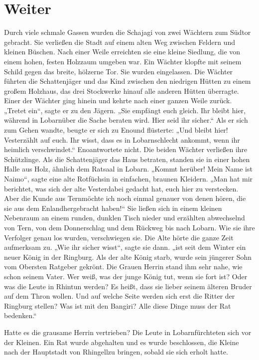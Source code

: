 \documentclass[12pt,a4paper,onecolumn,twoside,ngerman]{book}
\newcommand{\Tern}{Tern}
\newcommand{\Bangiri}{Bangiri}
\newcommand{\Enland}{Enland}
\newcommand{\Eno}{Eno}
\newcommand{\Lobarn}{Lobarn}
\newcommand{\Vester}{Vester}
\newcommand{\Naimo}{Naimo}
\newcommand{\Rhingell}{Rhingell}
\newcommand{\Rhin}{Rhin}
\begin{document}
\section{Weiter}
Durch viele schmale Gassen wurden die Schajagi von zwei Wächtern zum Südtor gebracht. Sie verließen die Stadt auf einem alten Weg zwischen Feldern und kleinen Büschen. Nach einer Weile erreichten sie eine kleine Siedlung, die von einem hohen, festen Holzzaum umgeben war. Ein Wächter klopfte mit seinem Schild gegen das breite, hölzerne Tor. Sie wurden eingelassen. Die Wächter führten die Schattenjäger und das Kind zwischen den niedrigen Hütten zu einem großem Holzhaus, das drei Stockwerke hinauf alle anderen Hütten überragte. Einer der Wächter ging hinein und kehrte nach einer ganzen Weile zurück.
„Tretet ein“, sagte er zu den Jägern. „Sie empfängt euch gleich. Ihr bleibt hier, während in \Lobarn über die Sache beraten wird. Hier seid ihr sicher.“ Als er sich zum Gehen wandte, beugte er sich zu \Eno und flüsterte: „Und bleibt hier! \Vester zählt auf euch. Ihr wisst, dass es in \Lobarn schlecht ankommt, wenn ihr heimlich verschwindet.“
\Eno antwortete nicht. Die beiden Wächter verließen ihre Schützlinge.
Als die Schattenjäger das Haus betraten, standen sie in einer hohen Halle aus Holz, ähnlich dem Ratsaal in \Lobarn.
„Kommt herüber! Mein Name ist \Naimo “, sagte eine alte Rotfüchsin in einfachen, braunen Kleidern. „Man hat mir berichtet, was sich der alte \Vester dabei gedacht hat, euch hier zu verstecken. Aber die Kunde aus \Tern möchte ich noch einmal genauer von denen hören, die sie aus dem \Enland hergebracht haben!“
Sie ließen sich in einem kleinen Nebenraum an einem runden, dunklen Tisch nieder und erzählten abwechselnd von \Tern, von dem Donnerschlag und dem Rückweg bis nach \Lobarn. Wie sie ihre Verfolger genau los wurden, verschwiegen sie.
Die Alte hörte die ganze Zeit aufmerksam zu.
„Wie ihr sicher wisst“, sagte sie dann. „ist seit dem Winter ein neuer König in der Ringburg. Als der alte König starb, wurde sein jüngerer Sohn vom Obersten Ratgeber gekrönt. Die Grauen Herrin stand ihm sehr nahe, wie schon seinem Vater. Wer weiß, was der junge König tut, wenn sie fort ist? Oder was die Leute in \Rhin tun werden? Es heißt, dass sie lieber seinem älteren Bruder auf dem Thron wollen. Und auf welche Seite werden sich erst die Ritter der Ringburg stellen? Was ist mit den \Bangiri? Alle diese Dinge muss der Rat bedenken.“  

Hatte es die grausame Herrin vertrieben?
Die Leute in \Lobarn fürchteten sich vor der Kleinen. Ein Rat wurde abgehalten und es wurde beschlossen, die Kleine nach der Hauptstadt von \Rhingell zu bringen, sobald sie sich erholt hatte.
\end{document}
